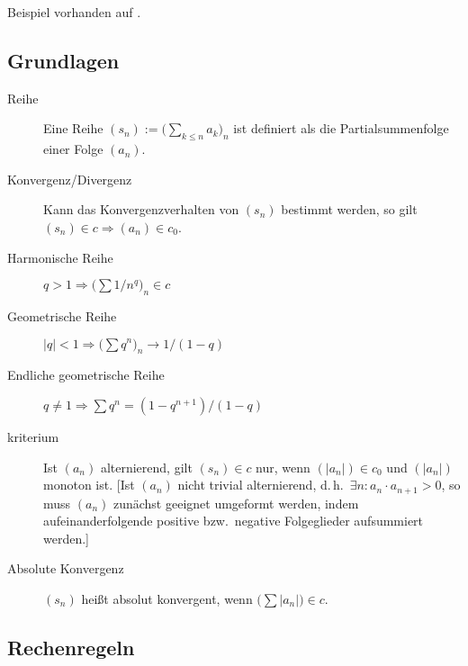 \CheckedBox{} Beispiel vorhanden auf .

\subsection{Grundlagen}
\begin{description}
    \item[Reihe] 
        Eine Reihe $(s_n) := \bigl(\sum_{k \leq n} a_k\bigr)_n$ ist definiert als die Partialsummenfolge einer Folge $(a_n)$.
    \item[Konvergenz/Divergenz] 
        Kann das Konvergenzverhalten von $(s_n)$ bestimmt werden, so gilt $(s_n) \in c \Rightarrow (a_n) \in c_0$.
    \item [Harmonische Reihe] 
        $q>1 \Rightarrow \bigl(\sum 1/n^q\bigr)_n \in c$
    \item [Geometrische Reihe] 
        $\lvert q \rvert<1 \Rightarrow \bigl(\sum q^n\bigr)_n \to 1/(1-q)$
    \item [Endliche geometrische Reihe] 
        $q\neq1 \Rightarrow \sum q^n = (1-q^{n+1})/(1-q)$
    \item [kriterium] 
        Ist $(a_n)$ alternierend, gilt $(s_n) \in c$ nur, wenn $(\lvert a_n \rvert) \in c_0$ und $(\lvert a_n \rvert)$ monoton ist.
        [Ist $(a_n)$ nicht trivial alternierend, d.\,h.~$\exists n : a_n \cdot a_{n+1} > 0$, so muss $(a_n)$ zunächst geeignet umgeformt werden, indem aufeinanderfolgende positive bzw.~negative Folgeglieder aufsummiert werden.]
    \item [Absolute Konvergenz] 
        $(s_n)$ heißt absolut konvergent, wenn $\bigl( \sum \lvert a_n \rvert \bigr) \in c$.
\end{description}

\subsection{Rechenregeln}

